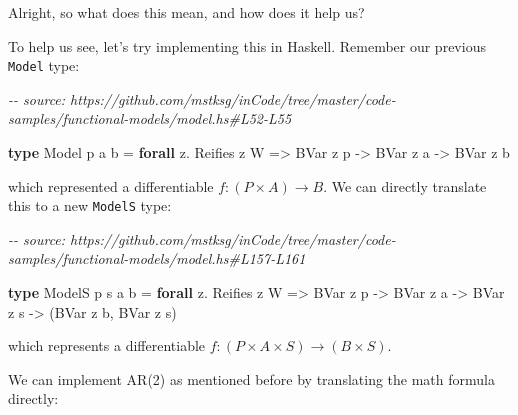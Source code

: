 \documentclass[]{article}
\newenvironment{Shaded}{}{}
\newcommand{\CommentTok}[1]{\textcolor[rgb]{0.38,0.63,0.69}{\textit{#1}}}
\newcommand{\DataTypeTok}[1]{\textcolor[rgb]{0.56,0.13,0.00}{#1}}
\newcommand{\KeywordTok}[1]{\textcolor[rgb]{0.00,0.44,0.13}{\textbf{#1}}}
\newcommand{\NormalTok}[1]{#1}
\newcommand{\OperatorTok}[1]{\textcolor[rgb]{0.40,0.40,0.40}{#1}}
\newcommand{\OtherTok}[1]{\textcolor[rgb]{0.00,0.44,0.13}{#1}}
\begin{document}
Alright, so what does this mean, and how does it help us?

To help us see, let's try implementing this in Haskell. Remember our previous
\texttt{Model} type:

\begin{Shaded}
\begin{Highlighting}[]
\CommentTok{{-}{-} source: https://github.com/mstksg/inCode/tree/master/code{-}samples/functional{-}models/model.hs\#L52{-}L55}

\KeywordTok{type} \DataTypeTok{Model}\NormalTok{ p a b }\OtherTok{=} \KeywordTok{forall}\NormalTok{ z}\OperatorTok{.} \DataTypeTok{Reifies}\NormalTok{ z }\DataTypeTok{W}
                \OtherTok{=\textgreater{}} \DataTypeTok{BVar}\NormalTok{ z p}
                \OtherTok{{-}\textgreater{}} \DataTypeTok{BVar}\NormalTok{ z a}
                \OtherTok{{-}\textgreater{}} \DataTypeTok{BVar}\NormalTok{ z b}
\end{Highlighting}
\end{Shaded}

which represented a differentiable \(f : (P \times A) \rightarrow B\). We can
directly translate this to a new \texttt{ModelS} type:

\begin{Shaded}
\begin{Highlighting}[]
\CommentTok{{-}{-} source: https://github.com/mstksg/inCode/tree/master/code{-}samples/functional{-}models/model.hs\#L157{-}L161}

\KeywordTok{type} \DataTypeTok{ModelS}\NormalTok{ p s a b }\OtherTok{=} \KeywordTok{forall}\NormalTok{ z}\OperatorTok{.} \DataTypeTok{Reifies}\NormalTok{ z }\DataTypeTok{W}
                   \OtherTok{=\textgreater{}} \DataTypeTok{BVar}\NormalTok{ z p}
                   \OtherTok{{-}\textgreater{}} \DataTypeTok{BVar}\NormalTok{ z a}
                   \OtherTok{{-}\textgreater{}} \DataTypeTok{BVar}\NormalTok{ z s}
                   \OtherTok{{-}\textgreater{}}\NormalTok{ (}\DataTypeTok{BVar}\NormalTok{ z b, }\DataTypeTok{BVar}\NormalTok{ z s)}
\end{Highlighting}
\end{Shaded}

which represents a differentiable \(f : (P \times A \times S) \rightarrow (B
\times S)\).

We can implement AR(2) as mentioned before by translating the math formula
directly:
\end{document}
